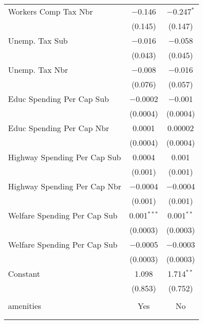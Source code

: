 \begin{table}[!htbp]
\begin{tabular}{@{\extracolsep{5pt}}lcc}
  Workers Comp Tax Nbr & $-$0.146 & $-$0.247$^{*}$ \\ 
  & (0.145) & (0.147) \\ 
  Unemp. Tax Sub & $-$0.016 & $-$0.058 \\ 
  & (0.043) & (0.045) \\ 
  Unemp. Tax Nbr & $-$0.008 & $-$0.016 \\ 
  & (0.076) & (0.057) \\ 
  Educ Spending Per Cap Sub & $-$0.0002 & $-$0.001 \\ 
  & (0.0004) & (0.0004) \\ 
  Educ Spending Per Cap Nbr & 0.0001 & 0.00002 \\ 
  & (0.0004) & (0.0004) \\ 
  Highway Spending Per Cap Sub & 0.0004 & 0.001 \\ 
  & (0.001) & (0.001) \\ 
  Highway Spending Per Cap Nbr & $-$0.0004 & $-$0.0004 \\ 
  & (0.001) & (0.001) \\ 
  Welfare Spending Per Cap Sub & 0.001$^{***}$ & 0.001$^{**}$ \\ 
  & (0.0003) & (0.0003) \\ 
  Welfare Spending Per Cap Sub & $-$0.0005 & $-$0.0003 \\ 
  & (0.0003) & (0.0003) \\ 
  Constant & 1.098 & 1.714$^{**}$ \\ 
  & (0.853) & (0.752) \\ 
 \hline \\[-1.8ex] 
amenities & Yes & No \\ 
\hline \\[-1.8ex] 
\hline 
\hline \\[-1.8ex] 
\end{tabular} 
\end{table} 
